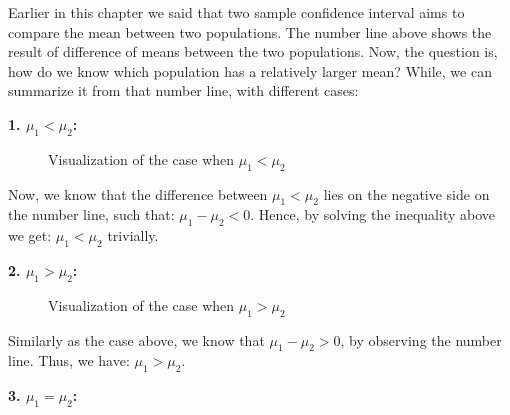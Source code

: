 Earlier in this chapter we said that two sample confidence interval aims to compare the mean between two populations. The number line above shows the result of difference of means between the two populations. Now, the question is, how do we know which population has a relatively larger mean? While, we can summarize it from that number line, with different cases:

\textbf{1. $\mu_1 < \mu_2$:}

\begin{center}
\begin{figure}[h!]
\centering
{}
\caption{Visualization of the case when $\mu_1 < \mu_2$}
\end{figure}
\end{center}

Now, we know that the difference between $\mu_1 < \mu_2$ lies on the negative side on the number line, such that: $\mu_1 - \mu_2 < 0$. Hence, by solving the inequality above we get: $\mu_1 < \mu_2$ trivially.

\textbf{2. $\mu_1 > \mu_2$:}

\begin{center}
\begin{figure}[h!]
\centering
{}
\caption{Visualization of the case when $\mu_1 > \mu_2$}
\end{figure}
\end{center}

Similarly as the case above, we know that $\mu_1 - \mu_2 > 0$, by observing the number line. Thus, we have: $\mu_1 > \mu_2$.

\textbf{3. $\mu_1 = \mu_2$:}

